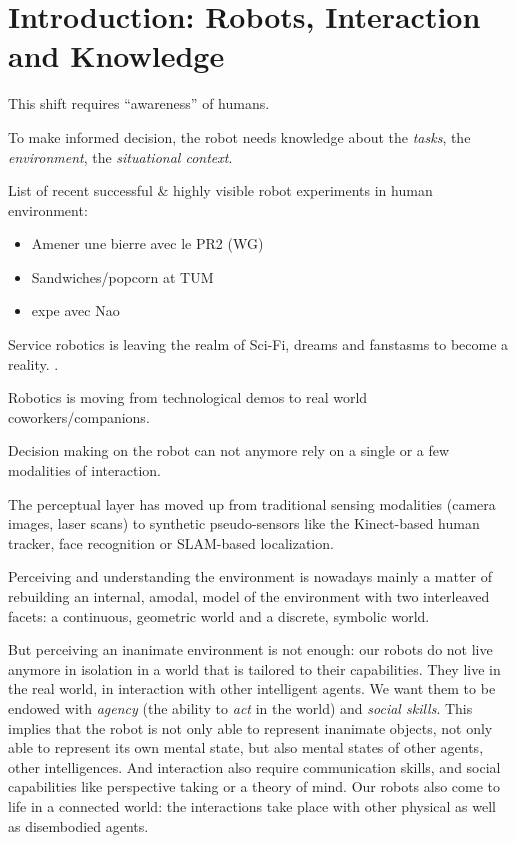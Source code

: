 \chapter{Introduction: Robots, Interaction and Knowledge}
\label{chapt|introduction}


This shift requires ``awareness'' of humans.

To make informed decision, the robot needs knowledge about the \emph{tasks},
the \emph{environment}, the \emph{situational context}.

List of recent successful \& highly visible robot experiments in human environment:
\begin{itemize}
    \item Amener une bierre avec le PR2 (WG)
    \item Sandwiches/popcorn at TUM
    \item expe avec Nao
\end{itemize}

Service robotics is leaving the realm of Sci-Fi, dreams and fanstasms to become
a reality. . 

Robotics is moving from technological demos to real world coworkers/companions.


Decision making on the robot can not anymore rely on a single or a few
modalities of interaction.

The perceptual layer has moved up from traditional sensing modalities (camera
images, laser scans) to synthetic pseudo-sensors like the Kinect-based human
tracker, face recognition or SLAM-based localization.

Perceiving and understanding the environment is nowadays mainly a matter of
rebuilding an internal, amodal, model of the environment with two interleaved
facets: a continuous, geometric world and a discrete, symbolic world.

But perceiving an inanimate environment is not enough: our robots do not live
anymore in isolation in a world that is tailored to their capabilities. They
live in the real world, in interaction with other intelligent agents. We want
them to be endowed with \emph{agency} (the ability to \emph{act} in the world)
and \emph{social skills}. This implies that the robot is not only able to
represent inanimate objects, not only able to represent its own mental state,
but also mental states of other agents, other intelligences. And interaction
also require communication skills, and social capabilities like perspective
taking or a theory of mind. Our robots also come to life in a connected world:
the interactions take place with other physical as well as disembodied agents.

